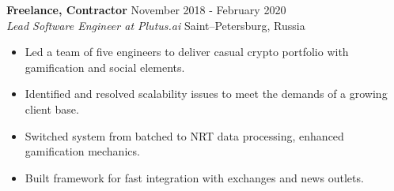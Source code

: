 \documentclass[a4paper]{article}
\newcommand{\employer} [4] {
    \textbf{#1} \hfill {#3} \\
    \textit{#2} \hfill {#4} \\
    \vspace{0mm}
}
\begin{document}
    \employer{Freelance, Contractor}{Lead Software Engineer at Plutus.ai}{November 2018 - February 2020}{Saint–Petersburg, Russia}
    \begin{itemize}[itemsep=-1mm]
        \item Led a team of five engineers to deliver casual crypto portfolio with gamification and social elements.
        \item Identified and resolved scalability issues to meet the demands of a growing client base.
        \item Switched system from batched to NRT data processing, enhanced gamification mechanics.
        \item Built framework for fast integration with exchanges and news outlets.
    \end{itemize}

%
%
\end{document}
